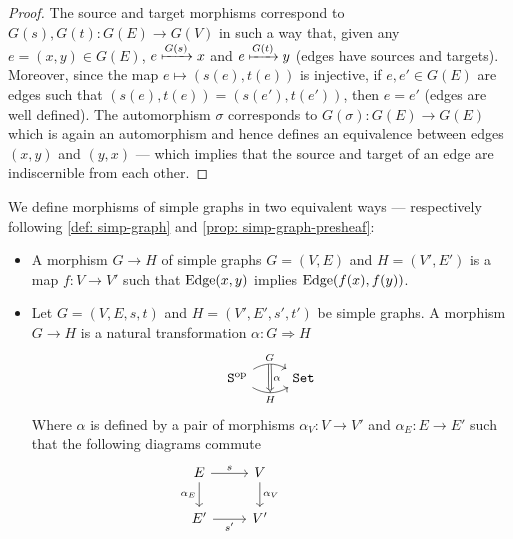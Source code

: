 \begin{proof}
    The source and target morphisms correspond to \(G(s), G(t): G(E) \to G(V)\) in
    such a way that, given any \(e = (x, y) \in G(E)\), \(e \xmapsto{G(s)} x\) and
    \(e \xmapsto{G(t)} y\) (edges have sources and targets). Moreover, since the
    map \(e \mapsto (s(e), t(e))\) is injective, if \(e, e' \in G(E)\) are edges
    such that \((s(e), t(e)) = (s(e'), t(e'))\), then \(e = e'\) (edges are well
    defined). The automorphism \(\sigma\) corresponds to \(G(\sigma): G(E) \to
    G(E)\) which is again an automorphism and hence defines an equivalence between
    edges \((x, y)\) and \((y, x)\) --- which implies that the source and target
    of an edge are indiscernible from each other.
\end{proof}

\begin{definition}
    We define morphisms of simple graphs in two equivalent ways --- respectively
    following \cref{def: simp-graph} and \cref{prop: simp-graph-presheaf}:
    \begin{itemize}
        \setlength\itemsep{0em}
        \item A morphism \(G \to H\) of simple graphs \(G = (V, E)\) and \(H = (V',
              E')\) is a map \(f: V \to V'\) such that \(\operatorname{Edge}(x, y)\) implies \(\operatorname{Edge}(f(x),
              f(y))\).
        \item Let \(G = (V, E, s, t)\) and \(H = (V', E', s', t')\) be simple
              graphs. A morphism \(G \to H\) is a natural transformation \(\alpha: G \Rightarrow H\)
              \[
                  \begin{tikzcd}
                      \cat S^\op
                      \ar[r, bend left, "G", ""{name=G}]
                      \ar[r, bend right, swap, "H", ""{name=H}]
                      &\Set
                      \ar[Rightarrow, "\alpha", from=G, to=H]
                  \end{tikzcd}
              \]
              Where \(\alpha\) is defined by a pair of morphisms \(\alpha_V: V \to V'\)
              and \(\alpha_E: E \to E'\) such that the following diagrams commute
              \[
                  \begin{tikzcd}
                      E \ar[r, "s"] \ar[d, swap, "\alpha_E"] &V \ar[d, "\alpha_V"]
                      \\
                      E' \ar[r, swap, "s'"] &V'
                  \end{tikzcd}
                  \qquad \qquad \qquad
\]
\end{itemize}
\end{definition}
